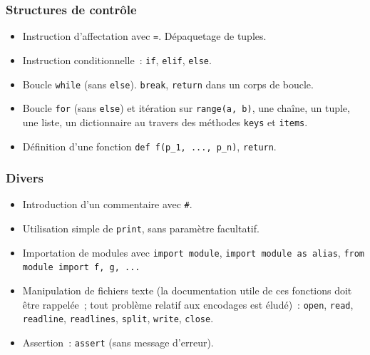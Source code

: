 \documentclass[book]{magnolia}
\begin{document}
\subsubsection*{Structures de contrôle}
\begin{itemize}
\item Instruction d'affectation avec \verb|=|. Dépaquetage de tuples.
\item Instruction conditionnelle~: \verb|if|, \verb|elif|, \verb|else|.
\item Boucle \verb|while| (sans \verb|else|). \verb|break|, \verb|return| dans un corps de boucle.
\item Boucle \verb|for| (sans \verb|else|) et itération sur \verb|range(a, b)|, une chaîne, un tuple, une liste, un dictionnaire au travers des méthodes \verb|keys| et \verb|items|.
\item Définition d'une fonction \verb|def f(p_1, ..., p_n)|, \verb|return|.
\end{itemize}

\subsubsection*{Divers}
\begin{itemize}
\item Introduction d'un commentaire avec \verb|#|.
\item Utilisation simple de \verb|print|, sans paramètre facultatif.
\item Importation de modules avec \verb|import module|, \verb|import module as alias|, \verb|from module import f, g, ...|
\item Manipulation de fichiers texte (la documentation utile de ces fonctions doit être rappelée~; tout problème relatif aux encodages est éludé)~: \verb|open|, \verb|read|, \verb|readline|, \verb|readlines|, \verb|split|, \verb|write|, \verb|close|.
\item Assertion~: \verb|assert| (sans message d'erreur).
\end{itemize}
\end{document}
